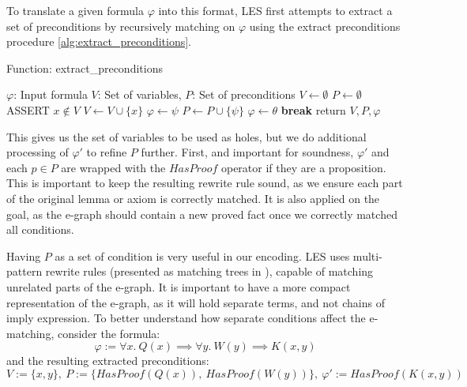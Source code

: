 To translate a given formula $\varphi$ into this format, LES first attempts to extract a set of preconditions by recursively matching on $\varphi$ using the extract preconditions procedure \autoref{alg:extract_preconditions}.
\begin{algorithm}
\caption{Function: extract\_preconditions}
\label{alg:extract_preconditions}
\begin{algorithmic}[1]
\REQUIRE $\varphi$: Input formula
\ENSURE $V$: Set of variables, $P$: Set of preconditions
\STATE $V \gets \emptyset$
\STATE $P \gets \emptyset$
        \STATE ASSERT $x \notin V$
        \STATE $V \gets V \cup \{x\}$
        \STATE $\varphi \gets \psi$
        \STATE $P \gets P \cup \{\psi\}$
        \STATE $\varphi \gets \theta$
    \ELSE
        \STATE \textbf{break}
    \ENDIF
\ENDWHILE
\STATE return $V, P, \varphi$
\end{algorithmic}
\end{algorithm}

This gives us the set of variables to be used as holes, but we do additional processing of $\varphi'$ to refine $P$ further.
First, and important for soundness, $\varphi'$ and each $p \in P$ are wrapped with the $HasProof$ operator if they are a proposition.
This is important to keep the resulting rewrite rule sound, as we ensure each part of the original lemma or axiom is correctly matched.
It is also applied on the goal, as the e-graph should contain a new proved fact once we correctly matched all conditions.

Having $P$ as a set of condition is very useful in our encoding.
LES uses multi-pattern rewrite rules (presented as matching trees in \cite{DBLP:conf/cade/MouraB07}), capable of matching unrelated parts of the e-graph. 
It is important to have a more compact representation of the e-graph, as it will hold separate terms, and not chains of imply expression. 
To better understand how separate conditions affect the e-matching, consider the formula:
\[
\varphi := \forall x.~Q(x) \implies \forall y.~W(y) \implies K(x, y)
\]
and the resulting extracted preconditions:
\[
V := \{ x, y \},~P := \{ HasProof(Q(x)),~HasProof(W(y)) \},~\varphi':=HasProof(K(x, y))
\]

